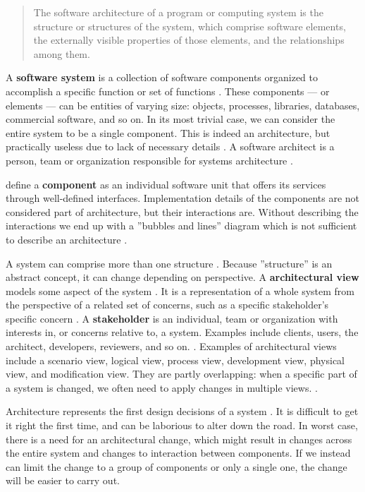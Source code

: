 \documentclass[utf8,english]{gradu3}
\begin{document}
\begin{quote}
  The software architecture of a program or computing system is the structure or
  structures of the system, which comprise software elements, the externally
  visible properties of those elements, and the relationships among them.
\end{quote}

A \textbf{software system} is a collection of software components organized to accomplish
a specific function or set of functions \parencite[3]{IEEE42010}. These components --- or
elements --- can be entities of varying size: objects, processes, libraries,
databases, commercial software, and so on. In its most trivial case, we can
consider the entire system to be a single component. This is indeed an
architecture, but practically useless due to lack of necessary details
\parencite[24]{Bass1998}. A software architect is a person, team or organization
responsible for systems architecture \parencite[3]{IEEE42010}.

\textcite[53]{Koskimies2005} define a \textbf{component} as an individual software
unit that offers its services through well-defined interfaces. Implementation
details of the components are not considered part of architecture, but their
interactions are. Without describing the interactions we end up with a ''bubbles
and lines'' diagram which is not sufficient to describe an architecture
\parencite[24]{Bass1998}.

A system can comprise more than one structure \parencite[23]{Bass1998}. Because
''structure'' is an abstract concept, it can change depending on perspective. A
\textbf{architectural view} models some aspect of the system \parencite{Koskimies2005}. It is a
representation of a whole system from the perspective of a related set of
concerns, such as a specific stakeholder's specific concern \parencite[3]{IEEE42010}. A
\textbf{stakeholder} is an individual, team or organization with interests in, or
concerns relative to, a system. Examples include clients, users, the architect,
developers, reviewers, and so on. \parencite[3]{IEEE42010}. Examples of architectural
views include a scenario view, logical view, process view,
development view, physical view, and modification view. They are partly
overlapping: when a specific part of a system is changed, we often need to apply
changes in multiple views. \parencite{Koskimies2005}.

Architecture represents the first design decisions of a system \parencite{Bass1998}. It is
difficult to get it right the first time, and can be laborious to alter down the
road. In worst case, there is a need for an architectural change, which might
result in changes across the entire system and changes to interaction between
components. If we instead can limit the change to a group of components or only
a single one, the change will be easier to carry out. \parencite[31]{Bass1998}
\end{document}
